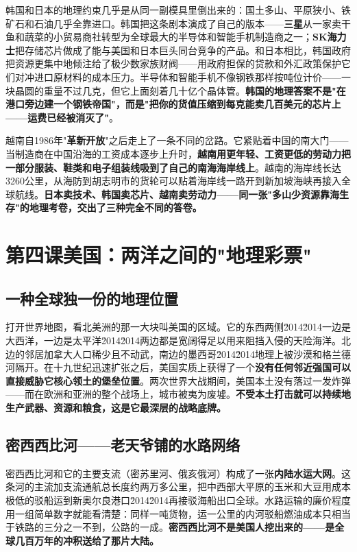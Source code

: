 \documentclass[a4paper,12pt]{ctexart}
\begin{document}
韩国和日本的地理约束几乎是从同一副模具里倒出来的：国土多山、平原狭小、铁矿石和石油几乎全靠进口。韩国把这条剧本演成了自己的版本——\textbf{三星}从一家卖干鱼和蔬菜的小贸易商社转型为全球最大的半导体和智能手机制造商之一；\textbf{SK海力士}把存储芯片做成了能与美国和日本巨头同台竞争的产品。和日本相比，韩国政府把资源更集中地倾注给了极少数家族财阀——用政府担保的贷款和外汇政策保护它们对冲进口原材料的成本压力。半导体和智能手机不像钢铁那样按吨位计价——一块晶圆的重量不过几克，但它上面刻着几十亿个晶体管。\:\textbf{韩国的地理答案不是"在港口旁边建一个钢铁帝国"，而是"把你的货值压缩到每克能卖几百美元的芯片上——运费已经被消灭了"}。

越南自1986年"\textbf{革新开放}"之后走上了一条不同的岔路。它紧贴着中国的南大门——当制造商在中国沿海的工资成本逐步上升时，\textbf{越南用更年轻、工资更低的劳动力把一部分服装、鞋类和电子组装线吸到了自己的南海海岸线上}。越南的海岸线长达3260公里，从海防到胡志明市的货轮可以贴着海岸线一路开到新加坡海峡再接入全球航线。\textbf{日本卖技术、韩国卖芯片、越南卖劳动力——同一张"多山少资源靠海生存"的地理考卷，交出了三种完全不同的答卷。}

\newpage

\section{\textcolor{orange!80!black}{第四课\quad 美国：两洋之间的"地理彩票"}}

\subsection*{一种全球独一份的地理位置}

打开世界地图，看北美洲的那一大块叫美国的区域。它的东西两侧\u2014\u2014一边是大西洋，一边是太平洋\u2014\u2014两边都是宽阔得足以用来阻挡入侵的天险海洋。北边的邻居加拿大人口稀少且不动武，南边的墨西哥\u2014\u2014地理上被沙漠和格兰德河隔开。在十九世纪迅速扩张之后，美国实质上获得了一个\textbf{没有任何邻近强国可以直接威胁它核心领土的堡垒位置}。两次世界大战期间，美国本土没有落过一发炸弹——而在欧洲和亚洲的整个战场上，城市被夷为废墟。\textbf{不受本土打击就可以持续地生产武器、资源和粮食，这是它最深层的战略底牌。}

\subsection*{密西西比河——老天爷铺的水路网络}

密西西比河和它的主要支流（密苏里河、俄亥俄河）构成了一张\textbf{内陆水运大网}。这条河的主流加支流通航总长度约两万多公里，把中西部大平原的玉米和大豆用成本极低的驳船运到新奥尔良港口\u2014\u2014再接驳海船出口全球。水路运输的廉价程度用一组简单数字就能看清楚：同样一吨货物，运一公里的内河驳船燃油成本只相当于铁路的三分之一不到，公路的一成。\textbf{密西西比河不是美国人挖出来的——是全球几百万年的冲积送给了那片大陆。}
\end{document}
